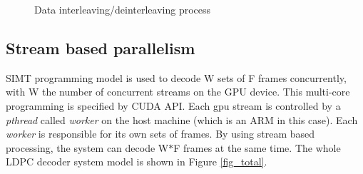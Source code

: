 \documentclass[conference]{IEEEtran}
\begin{document}
\begin{figure}[h]
\begin{centering}
\caption[width=.3\textwidth]{Data interleaving/deinterleaving process}
\label{fig_intreleave}
\end{centering}
\end{figure}

\subsection{Stream based parallelism}

SIMT programming model is used to decode W sets of F frames concurrently, with W the number of concurrent streams on the GPU device. This multi-core programming is specified by CUDA API. Each gpu stream is controlled by a \textit{pthread} called \textit{worker} on the host machine (which is an ARM in this case). Each \textit{worker} is responsible for its own sets of frames. By using stream based processing, the system can decode W$*$F frames at the same time. The whole LDPC decoder system model is shown in Figure \ref{fig_total}.
\end{document}
